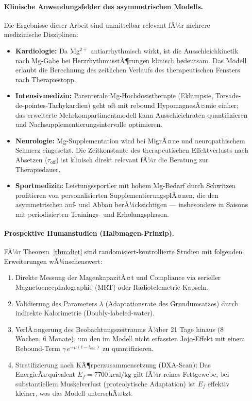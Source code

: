 ﻿\documentclass[12pt,a4paper]{article}
\theoremstyle{plain}
\theoremstyle{definition}
\theoremstyle{remark}
\begin{document}
\paragraph{Klinische Anwendungsfelder des asymmetrischen Modells.}
Die Ergebnisse dieser Arbeit sind unmittelbar relevant fÃ¼r mehrere
medizinische Disziplinen:
\begin{itemize}
  \item \textbf{Kardiologie:} Da Mg$^{2+}$ antiarrhythmisch wirkt, ist
        die Ausschleichkinetik nach Mg-Gabe bei HerzrhythmusstÃ¶rungen
        klinisch bedeutsam. Das Modell erlaubt die Berechnung des
        zeitlichen Verlaufs des therapeutischen Fensters nach Therapiestopp.
  \item \textbf{Intensivmedizin:} Parenterale Mg-Hochdosistherapie
        (Eklampsie, Torsade-de-pointes-Tachykardien) geht oft mit rebound
        HypomagnesÃ¤mie einher; das erweiterte Mehrkompartimentmodell kann
        Ausschleichraten quantifizieren und Nachsupplementierungsintervalle
        optimieren.
  \item \textbf{Neurologie:} Mg-Supplementation wird bei MigrÃ¤ne und
        neuropathischem Schmerz eingesetzt. Die Zeitkonstante des
        therapeutischen Effektverlusts nach Absetzen ($\tau_\text{off}$)
        ist klinisch direkt relevant fÃ¼r die Beratung zur
        Therapiedauer.
  \item \textbf{Sportmedizin:} Leistungssportler mit hohem Mg-Bedarf
        durch Schwitzen profitieren von personalisierten
        SupplementierungsplÃ¤nen, die den asymmetrischen auf- und
        Abbau berÃ¼cksichtigen --- insbesondere in Saisons mit
        periodisierten Trainings- und Erholungsphasen.
\end{itemize}

\paragraph{Prospektive Humanstudien (Halbmagen-Prinzip).}
FÃ¼r Theorem~\ref{thm:diet} sind randomi\-siert-kontrollierte Studien mit
folgenden Erweiterungen wÃ¼nschenswert:
\begin{enumerate}[label=(\roman*)]
  \item Direkte Messung der MagenkapazitÃ¤t und Compliance via
        serieller Magnetoencephalographie (MRT) oder Radiotelemetrie-Kapseln.
  \item Validierung des Parameters $\lambda$ (Adaptationsrate des
        Grundumsatzes) durch indirekte Kalorimetrie (Doubly-labeled-water).
  \item VerlÃ¤ngerung des Beobachtungszeitraums Ã¼ber 21 Tage hinaus
        (8 Wochen, 6 Monate), um den im Modell nicht erfassten Jojo-Effekt
        mit einem Rebound-Term $\gamma \, e^{+\mu (t-t_\text{end})}$ zu
        quantifizieren.
  \item Stratifizierung nach KÃ¶rperzusammensetzung (DXA-Scan): Das
        EnergieÃ¤quivalent $E_f = 7700\,\text{kcal/kg}$ gilt fÃ¼r reines
        Fettgewebe; bei substantiellem Muskelverlust (proteolytische Adaptation)
        ist $E_f$ effektiv kleiner, was das Modell unterschÃ¤tzt.
\end{enumerate}
\end{document}

